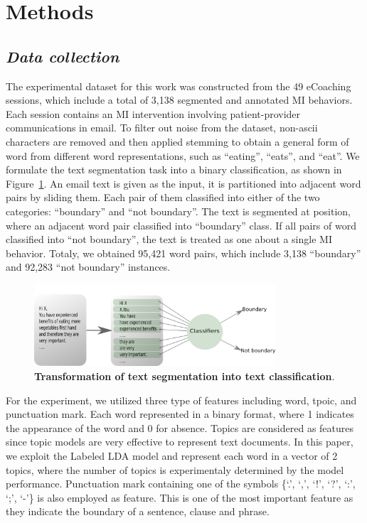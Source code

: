 \documentclass{amia}
\begin{document}
\section*{Methods}
\subsection*{\textit{Data collection}}
The experimental dataset for this work was constructed from the 49 eCoaching sessions, which include a total of 3,138 segmented and annotated MI behaviors. Each session contains an MI intervention involving patient-provider communications in email. To filter out noise from the dataset, non-ascii characters are removed and then applied stemming to obtain a general form of word from different word representations, such as ``eating'', ``eats'', and ``eat''. We formulate the text segmentation task into a binary classification, as shown in Figure~\ref{fig:classifier}. An email text is given as the input, it is partitioned into adjacent word pairs by sliding them. Each pair of them classified into either of the two categories: ``boundary'' and ``not boundary''. The text is segmented at position, where an adjacent word pair classified into ``boundary'' class. If all pairs of word classified into ``not boundary'', the text is treated as one about a single MI behavior. Totaly, we obtained 95,421 word pairs, which include 3,138 ``boundary'' and 92,283 ``not boundary'' instances.    

\begin{figure}[!htb]
    \centering
    \includegraphics[width=0.80\textwidth]{figures/classifier.png}
    \caption{\textbf{Transformation of text segmentation into text classification}.}
    \label{fig:classifier}
\end{figure}


For the experiment, we utilized three type of features including word, tpoic, and punctuation mark. Each word represented in a binary format, where 1 indicates the appearance of the word and 0 for absence. Topics are considered as features since topic models are very effective\cite{kotov2015interpretable,hashimoto2016topic,lu2016modeling} to represent text documents. In this paper, we exploit the Labeled LDA model\cite{kotov2015interpretable} and represent each word in a vector of 2 topics, where the number of topics is experimentaly determined by the model performance. Punctuation mark containing one of the symbols \{`.', `,', `!', `?', `:', `;', `-'\} is also employed as feature. This is one of the most important feature as they indicate the boundary of a sentence, clause and phrase.   
\end{document}
